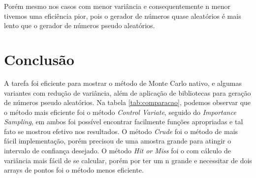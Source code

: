 \documentclass{article}
\begin{document}
Porém mesmo nos casos com menor variância e consequentemente n menor tivemos uma eficiência pior, pois o gerador de números quase aleatórios é mais lento que o gerador de números pseudo aleatórios.


\section{Conclusão}

A tarefa foi eficiente para mostrar o método de Monte Carlo nativo, e algumas variantes com redução de variância, além de aplicação de bibliotecas para geração de números pseudo aleatórios.
Na tabela \ref{tab:comparacao}, podemos observar que o método mais eficiente foi o método \textit{Control Variate}, seguido do \textit{Importance Sampling}, em ambos foi possível encontrar facilmente funções apropriadas e tal fato se mostrou efetivo nos resultados.
O método \textit{Crude} foi o método de mais fácil implementação, porém precisou de uma amostra grande para atingir o intervalo de confiança desejado. O método \textit{Hit or Miss} foi o com cálculo de variância mais fácil de se calcular, porém por ter um n grande e necessitar de dois arrays de pontos foi o método menos eficiente.


\newpage


\end{document}
